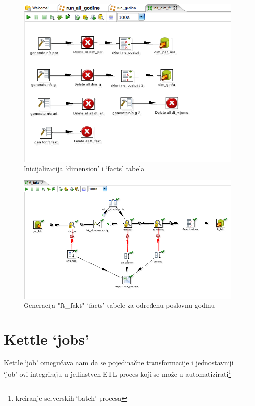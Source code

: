 \documentclass[times, utf8, seminar]{fit}
\begin{document}
\begin{figure}[H]
\centering
\includegraphics[width=15cm]{img/kettle_tr_init_dim_fpt.png}
\caption{Inicijalizacija `dimension' i `facts' tabela}
\end{figure}


\begin{figure}[H]
\centering
\includegraphics[width=15cm]{img/kettle_tr_ft_fakt.png}
\caption{Generacija "ft\_fakt" `facts' tabele za određenu poslovnu godinu}
\end{figure}

\section{Kettle `jobs'}

Kettle `job' omogućava nam da se pojedinačne transformacije i jednostavniji `job'-ovi integriraju u jedinstven ETL proces koji se može u automatizirati\footnote{kreiranje serverskih `batch' procesa}
\end{document}
